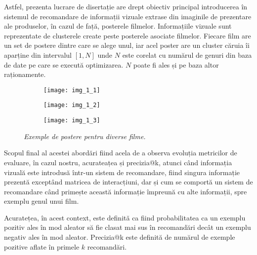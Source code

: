 Astfel, prezenta lucrare de disertație are drept obiectiv principal introducerea în sistemul de recomandare de informații vizuale extrase din imaginile de prezentare ale produselor, în cazul de față, posterele filmelor. Informațiile vizuale sunt reprezentate de clusterele create peste posterele asociate filmelor. Fiecare film are un set de postere dintre care se alege unul, iar acel poster are un cluster căruia îi aparține din intervalul $[1, N]$ unde $N$ este corelat cu numărul de genuri din baza de date pe care se execută optimizarea. $N$ poate fi ales și pe baza altor raționamente.

\begin{figure}[!htbp]
  \begin{subfigure}[b]{0.3\textwidth}
    \texttt{[image: img\_1\_1]}
  \end{subfigure}
  \hfill
  \begin{subfigure}[b]{0.3\textwidth}
    \texttt{[image: img\_1\_2]}
  \end{subfigure}
  \hfill
  \begin{subfigure}[b]{0.3\textwidth}
    \texttt{[image: img\_1\_3]}
  \end{subfigure}
  \caption[Exemple de postere]{\textit{Exemple de postere pentru diverse filme.}}
\end{figure}

Scopul final al acestei abordări fiind acela de a observa evoluția metricilor de evaluare, în cazul nostru, acurateațea și precizia@k, atunci când informația vizuală este introdusă într-un sistem de recomandare, fiind singura informație prezentă exceptând matricea de interacțiuni, dar și cum se comportă un sistem de recomandare când primește această informație împreună cu alte informații, spre exemplu genul unui film.

Acuratețea, în acest context, este definită ca fiind probabilitatea ca un exemplu pozitiv ales în mod aleator să fie clasat mai sus în recomandări decât un exemplu negativ ales în mod aleator. Precizia@k este definită de numărul de exemple pozitive aflate în primele $k$ recomandări.

